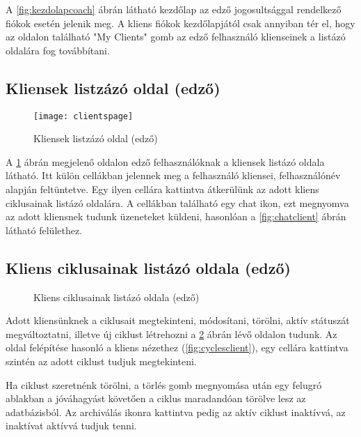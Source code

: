 A \ref{fig:kezdolapcoach} ábrán látható kezdőlap az edző jogosultsággal rendelkező fiókok esetén jelenik meg. A kliens fiókok kezdőlapjától csak annyiban tér el, hogy az oldalon található "My Clients" gomb az edző felhasználó klienseinek a listázó oldalára fog továbbítani.

\subsection{Kliensek listzázó oldal (edző)}

\begin{figure}[H]
	\centering
	\texttt{[image: clientspage]}
	\caption{Kliensek listzázó oldal (edző)}
	\label{fig:clientspage}
\end{figure}

A \ref{fig:clientspage} ábrán megjelenő oldalon edző felhasználóknak a kliensek listázó oldala látható. Itt külön cellákban jelennek meg a felhasználó kliensei, felhasználónév alapján feltüntetve. Egy ilyen cellára kattintva átkerülünk az adott kliens ciklusainak listázó oldalára. A cellákban található egy chat ikon, ezt megnyomva az adott kliensnek tudunk üzeneteket küldeni, hasonlóan a \ref{fig:chatclient} ábrán látható felülethez.

\subsection{Kliens ciklusainak listázó oldala (edző)}

\begin{figure}[H]
	\centering
	\hspace{5pt}
	\caption{Kliens ciklusainak listázó oldala (edző)}
	\label{fig:clientpage}
\end{figure}

Adott kliensünknek a ciklusait megtekinteni, módosítani, törölni, aktív státuszát megváltoztatni, illetve új ciklust létrehozni a \ref{fig:clientpage} ábrán lévő oldalon tudunk. Az oldal felépítése hasonló a kliens nézethez (\ref{fig:cyclesclient}), egy cellára kattintva szintén az adott ciklust tudjuk megtekinteni.

Ha ciklust szeretnénk törölni, a törlés gomb megnyomása után egy felugró ablakban a jóváhagyást követően a ciklus maradandóan törölve lesz az adatbázisból. Az archiválás ikonra kattintva pedig az aktív ciklust inaktívvá, az inaktívat aktívvá tudjuk tenni.

